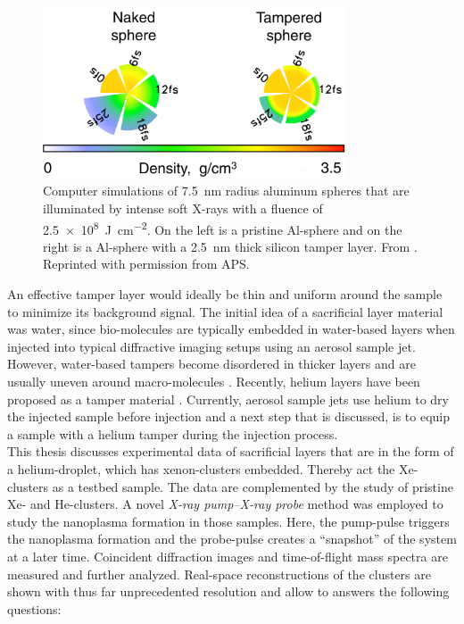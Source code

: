 %
\begin{figure}
	\centering
		\includegraphics[width=0.80\textwidth]{images/tamper-layer.png}
	\caption[Computer simulations of aluminum spheres with tamper layers]{Computer simulations of \SI{7.5}{\nano\meter} radius aluminum spheres that are illuminated by intense soft X-rays with a fluence of \SI{2.5e8}{\joule\per\square\centi\meter}. On the left is a pristine Al-sphere and on the right is a Al-sphere with a \SI{2.5}{\nano\meter} thick silicon tamper layer. From \citep{Hau-Riege-2010-PRL}. Reprinted with permission from APS.}
	\label{fig:tamper-layer}
\end{figure}
%
An effective tamper layer would ideally be thin and uniform around the sample to minimize its background signal. The initial idea of a sacrificial layer material was water, since bio-molecules are typically embedded in water-based layers when injected into typical diffractive imaging setups using an aerosol sample jet. However, water-based tampers become disordered in thicker layers and are usually uneven around macro-molecules \cite{Aquila-2015-StrucDyn}. Recently, helium layers have been proposed as a tamper material \cite{Mikaberidze-2008-PRA}. Currently, aerosol sample jets use helium to dry the injected sample before injection and a next step that is discussed, is to equip a sample with a helium tamper during the injection process.\\[1\baselineskip]
%
This thesis discusses experimental data of sacrificial layers that are in the form of a helium-droplet, which has xenon-clusters embedded. Thereby act the Xe-clusters as a testbed sample. The data are complemented by the study of pristine Xe- and He-clusters. A novel \textit{X-ray pump--X-ray probe} method was employed to study the nanoplasma formation in those samples. Here, the pump-pulse triggers the nanoplasma formation and the probe-pulse creates a ``snapshot'' of the system at a later time. Coincident diffraction images and time-of-flight mass spectra are measured and further analyzed. Real-space reconstructions of the clusters are shown with thus far unprecedented resolution and allow to answers the following questions:
